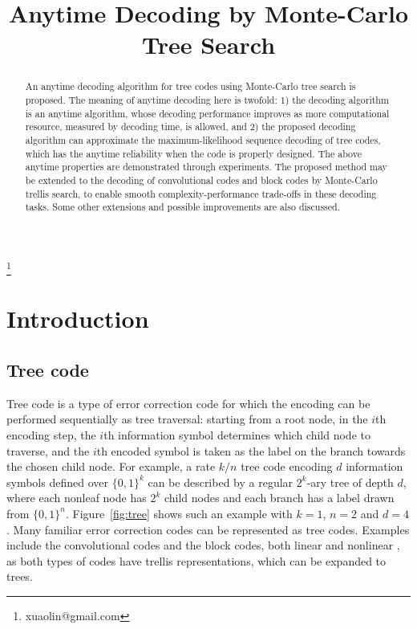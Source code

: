 \documentclass[conference,letterpaper]{IEEEtran}
\newcommand\blfootnote[1]{%
	\begingroup
	\renewcommand\thefootnote{}\footnote{#1}%
	\addtocounter{footnote}{-1}%
	\endgroup
}
\begin{document}
\title{Anytime Decoding by Monte-Carlo Tree Search}

\author{%
  \IEEEauthorblockA{}
}




\maketitle

\begin{abstract}
An anytime decoding algorithm for tree codes using Monte-Carlo tree search is proposed.
The meaning of anytime decoding here is twofold: 1) the decoding algorithm is an anytime algorithm, whose decoding performance improves as more computational resource, measured by decoding time, is allowed, and 2) the proposed decoding algorithm can approximate the maximum-likelihood sequence decoding of tree codes, which has the anytime reliability when the code is properly designed. The above anytime properties are demonstrated through experiments.
The proposed method may be extended to the decoding of convolutional codes and block codes by Monte-Carlo trellis search, to enable smooth complexity-performance trade-offs in these decoding tasks.
Some other extensions and possible improvements are also discussed.
\end{abstract}

\blfootnote{xuaolin@gmail.com}
	
\section{Introduction}
\subsection{Tree code}
Tree code is a type of error correction code for which the encoding can be performed sequentially as tree traversal: starting from a root node, in the $i$th encoding step, the $i$th information symbol determines which child node to traverse, and the $i$th encoded symbol is taken as the label on the branch towards the chosen child node. For example, a rate $k/n$ tree code encoding $d$ information symbols defined over $\{0,1\}^k$ can be described by a regular $2^k$-ary tree of depth $d$, where each nonleaf node has $2^k$ child nodes and each branch has a label drawn from $\{0,1\}^n$.
Figure~\ref{fig:tree} shows such an example with $k=1$, $n=2$ and $d=4$.
Many familiar error correction codes can be represented as tree codes. Examples include the convolutional codes \cite{Wozencraft1957Sequential} and the block codes, both linear \cite{BCJR} and nonlinear \cite{trellis_blk}, as both types of codes have trellis representations, which can be expanded to trees.
\end{document}
